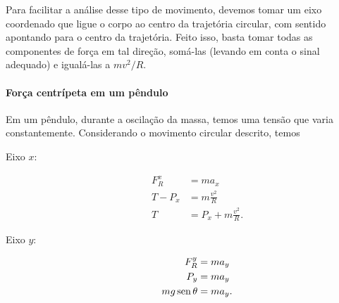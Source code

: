 Para facilitar a análise desse tipo de movimento, devemos tomar um eixo coordenado que ligue o corpo ao centro da trajetória circular, com sentido apontando para o centro da trajetória. Feito isso, basta tomar todas as componentes de força em tal direção, somá-las (levando em conta o sinal adequado) e igualá-las a $m v^2/R$.

\paragraph{Força centrípeta em um pêndulo}

Em um pêndulo, durante a oscilação da massa, temos uma tensão que varia constantemente. Considerando o movimento circular descrito, temos
\begin{description}
    \item[Eixo $x$:]
        \begin{align}
            F_R^x &= m a_x \\
            T - P_x &= m \frac{v^2}{R} \\
            T &= P_x + m\frac{v^2}{R}.
        \end{align}
    \item[Eixo $y$:]
        \begin{align}
            F_R^y &= m a_y \\
            P_y &= m a_y \\
            mg \operatorname{sen}\theta &= m a_y.
        \end{align}
\end{description}

